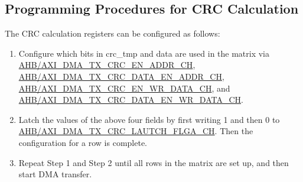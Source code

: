 \documentclass[main\_\_EN.tex]{subfiles}
\begin{document}
\subsection{Programming Procedures for CRC Calculation}

The CRC calculation registers can be configured as follows:

\begin{enumerate}
    \item Configure which bits in crc\_tmp and data are used in the matrix via \hyperref[fielddesc:AHBDMATXCRCENADDRCHN]{AHB/AXI\_DMA\_TX\_CRC\_EN\_ADDR\_CH}, \hyperref[fielddesc:AHBDMATXCRCDATAENADDRCHN]{AHB/AXI\_DMA\_TX\_CRC\_DATA\_EN\_ADDR\_CH}, \hyperref[fielddesc:AHBDMATXCRCENWRDATACHN]{AHB/AXI\_DMA\_TX\_CRC\_EN\_WR\_DATA\_CH}, and \hyperref[fielddesc:AHBDMATXCRCDATAENWRDATACHN]{AHB/AXI\_DMA\_TX\_CRC\_DATA\_EN\_WR\_DATA\_CH}.
    \item Latch the values of the above four fields by first writing 1 and then 0 to \hyperref[fielddesc:AHBDMATXCRCLAUTCHFLGACHN]{AHB/AXI\_DMA\_TX\_CRC\_LAUTCH\_FLGA\_CH}. Then the configuration for a row is complete.
    \item Repeat Step 1 and Step 2 until all rows in the matrix are set up, and then start DMA transfer.
\end{enumerate}




\end{document}
